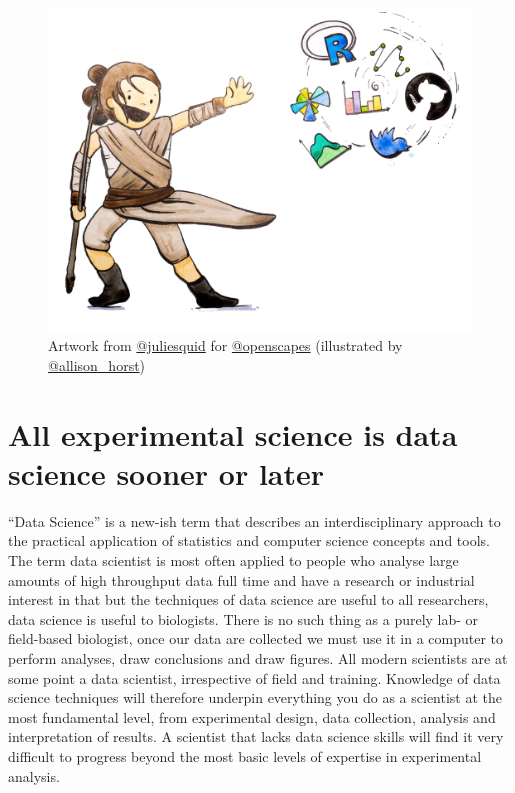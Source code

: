\documentclass[
]{book}
\begin{document}
\begin{figure}
\centering
\includegraphics{starwars-rey-rstats.png}
\caption{\label{fig:unnamed-chunk-2}Artwork from \href{https://twitter.com/juliesquid}{@juliesquid} for \href{https://twitter.com/openscapes}{@openscapes} (illustrated by \href{https://twitter.com/allison_horst}{@allison\_horst})}
\end{figure}

\hypertarget{all-experimental-science-is-data-science-sooner-or-later}{%
\section{All experimental science is data science sooner or later}\label{all-experimental-science-is-data-science-sooner-or-later}}

``Data Science'' is a new-ish term that describes an interdisciplinary approach to the practical application of statistics and computer science concepts and tools. The term data scientist is most often applied to people who analyse large amounts of high throughput data full time and have a research or industrial interest in that but the techniques of data science are useful to all researchers, data science is useful to biologists. There is no such thing as a purely lab- or field-based biologist, once our data are collected we must use it in a computer to perform analyses, draw conclusions and draw figures. All modern scientists are at some point a data scientist, irrespective of field and training. Knowledge of data science techniques will therefore underpin everything you do as a scientist at the most fundamental level, from experimental design, data collection, analysis and interpretation of results. A scientist that lacks data science skills will find it very difficult to progress beyond the most basic levels of expertise in experimental analysis.
\end{document}
